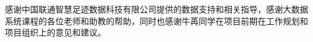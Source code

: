 \documentclass[
11pt, %
english, %
singlespacing, %
headsepline, %
]{MastersDoctoralThesis} %
\begin{document}

\begin{acknowledgements}
\addchaptertocentry{\acknowledgementname} %
感谢中国联通智慧足迹数据科技有限公司提供的数据支持和相关指导，感谢大数据系统课程的各位老师和助教的帮助，同时也感谢牛苒同学在项目前期在工作规划和项目组织上的意见和建议。\\
\end{acknowledgements}


\tableofcontents %

\listoffigures %

\listoftables %



\mainmatter %

\pagestyle{thesis} %



 

 
% 


\appendix %




%




\end{document}
